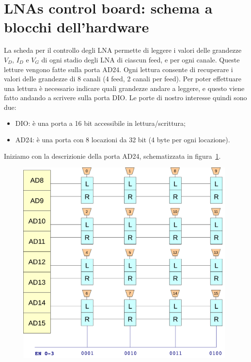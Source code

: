 \section{LNAs control board: schema a blocchi dell'hardware}
La scheda per il controllo degli LNA permette di leggere i valori delle grandezze
$V_D$, $I_D$ e $V_G$ di ogni stadio degli LNA di ciascun feed, e per ogni canale.
Queste letture vengono fatte sulla porta AD24. Ogni lettura consente di recuperare i valori delle grandezze
di 8 canali (4 feed, 2 canali per feed). Per poter effettuare una lettura \`e necessario indicare
quali grandezze andare a leggere, e questo viene fatto andando a scrivere sulla porta DIO. Le porte di nostro
interesse quindi sono due:
\begin{itemize}
\item DIO: \`e una porta a 16 bit accessibile in lettura/scrittura;
\item AD24: \`e una porta con 8 locazioni da 32 bit (4 byte per ogni locazione).
\end{itemize}
Iniziamo con la descrizionie della porta AD24, schematizzata in figura~\ref{fig:AD24}.
\begin{center}
\begin{figure}[!htbp]
        \begin{center}
        \includegraphics[width=11cm]{figure/AD24}
        \end{center}
         \label{fig:AD24}
\end{figure}
\end{center}
